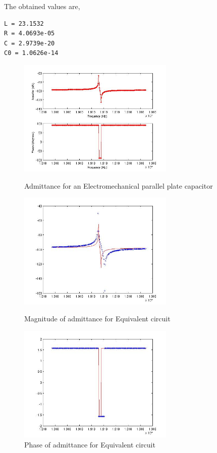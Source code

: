 The obtained values are,
\begin{verbatim}
L = 23.1532
R = 4.0693e-05
C = 2.9739e-20
C0 = 1.0626e-14
\end{verbatim}

\begin{figure}[htbp]
\centering
\includegraphics[height = 2.2in]{fig/em_pp_capacitor_admittance.jpg}
\caption{Admittance for an Electromechanical parallel plate capacitor}
\label{fig:ElectromechanicalParallelPlateCapacitorAdmittance}
\includegraphics[height = 2.2in]{fig/em_pp_capacitor_eq_magnitude.jpg}
\caption{Magnitude of admittance for Equivalent circuit}
\label{fig:ElectromechanicalParallelPlateCapacitorEqMagnitude}
\includegraphics[height = 2.2in]{fig/em_pp_capacitor_eq_phase.jpg}
\caption{Phase of admittance for Equivalent circuit}
\label{fig:ElectromechanicalParallelPlateCapacitorEqPhase}
\end{figure}
